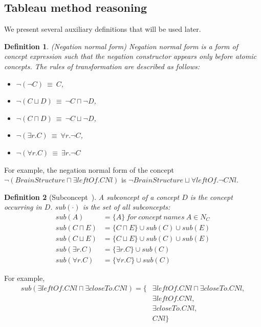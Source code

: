 \documentclass{article}
\newtheorem{mydef}{Definition}
\begin{document}
\subsection{Tableau method reasoning}\label{sec:reasoning}
We present several auxiliary definitions that will be used later.
\begin{mydef}(Negation normal form)
Negation normal form is a form of concept expression such that the negation constructor appears only before atomic concepts.
The rules of transformation are described as follows:
\begin{itemize}
\item  $\neg(\neg C) ~\equiv~ C$,
\item $\neg(C\sqcup D) ~\equiv~ \neg C \sqcap \neg D$,
\item $\neg(C\sqcap D) ~\equiv~ \neg C \sqcup \neg D$,
\item $\neg(\exists r.C) ~\equiv~ \forall r.\neg C$,
\item $\neg(\forall r.C) ~\equiv~  \exists r.\neg C$
\end{itemize}
\end{mydef}
For example, the negation normal form of the concept $\neg (BrainStructure\sqcap \exists leftOf.CNl)$ is $\neg BrainStructure \sqcup \forall leftOf.\neg CNl$.

\begin{mydef}[Subconcept~\cite{horrocks1999description}]
 A subconcept of a concept $D$ is the concept occurring in $D$. $sub(\cdot)$ is the set of all subconcepts:
 \begin{align*}
 sub(A)&=\{A\}~for~concept~names~A\in N_C\\
 sub(C\sqcap E)&=\{C\sqcap E\}\cup sub(C)\cup sub(E)\\
 sub(C\sqcup E)&=\{C\sqcup E\}\cup sub(C)\cup sub(E)\\
 sub(\exists r.C)&=\{\exists r.C\}\cup sub(C)\\
 sub(\forall r.C)&=\{\forall r.C\}\cup sub(C)
 \end{align*}
\end{mydef}

For example, 
 \begin{align*}
 sub(\exists leftOf.CNl \sqcap \exists closeTo.CNl)=\{&\exists leftOf.CNl \sqcap \exists closeTo.CNl,\\
 &\exists leftOf.CNl,\\
 &\exists closeTo.CNl,\\
 &CNl\}
 \end{align*}
\end{document}
